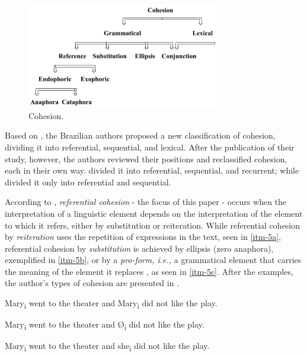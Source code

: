 \documentclass{textolivre}
\begin{document}
%
% 
\begin{figure}[htbp]
 \centering
 \includegraphics[width=0.75\textwidth]{fig01.png}
 \caption{Cohesion.}
 \label{fig01}
\end{figure}



Based on \textcite{halliday_cohesion_1976}, the Brazilian authors \textcite{favero_criterios_1985}
proposed a new classification of cohesion, dividing it into
referential, sequential, and lexical. After the publication of their
study, however, the authors reviewed their positions and reclassified
cohesion, each in their own way. \textcite{favero_coesao_2010} divided it into
referential, sequential, and recurrent; while \textcite{koch_coesao_2010} divided it
only into referential and sequential.

According to \textcite[p.~18-25]{favero_coesao_2010}, \emph{referential cohesion} - the
focus of this paper - occurs when the interpretation of a linguistic
element depends on the interpretation of the element to which it refers,
either by substitution or reiteration. While referential cohesion by
\emph{reiteration} uses the repetition of expressions in the text, seen
in \ref{itm-5a}, referential cohesion by \emph{substitution} is achieved by
ellipsis (zero anaphora), exemplified in \ref{itm-5b}, or by a \emph{pro-form,
i.e.,} a grammatical element that carries the meaning of the element it
replaces \cite[p.~19]{favero_coesao_2010}, as seen in \ref{itm-5c}. After the examples, the
author's types of cohesion are presented in .

%
%
\begin{description}[topsep=1ex,partopsep=1ex]
  \item[(5a)\label{itm-5a}] Mary\textsubscript{i} went to the theater and Mary\textsubscript{i} did not like the play. 
  \item[(5b)\label{itm-5b}] Mary\textsubscript{i} went to the theater and Ø\textsubscript{i} did not like the play.
  \item[(5c)\label{itm-5c}] Mary\textsubscript{i} went to the theater and she\textsubscript{i} did not like the play.
\end{description}
\end{document}
